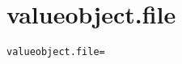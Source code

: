 \section{valueobject.file}
\label{configuration:ValueobjectFile}
\AvailableInJavaAndCsharp{\TODO}
\begin{lstlisting}[style=Props,caption={Usage example for \textit{valueobject.file}}]
valueobject.file=
\end{lstlisting}